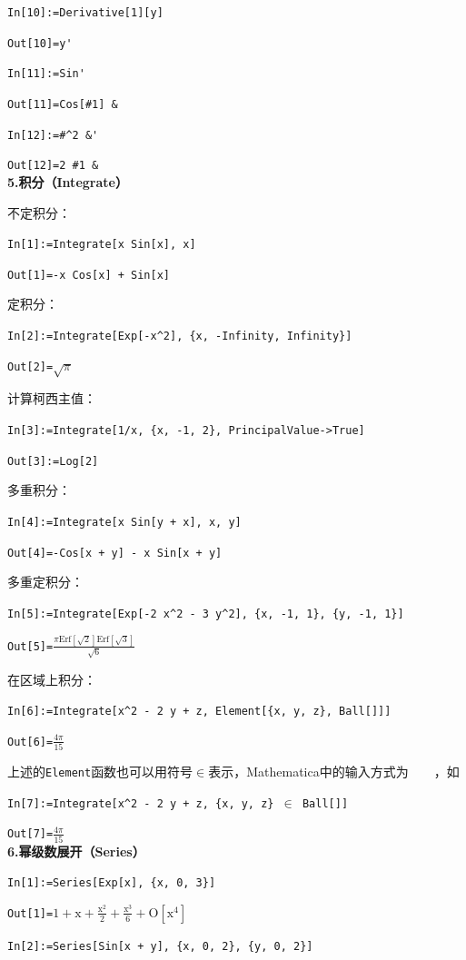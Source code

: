 \documentclass[UTF8,a4paper,10pt]{ctexart}
\newcommand{\mma}{Mathematica}
\begin{document}
\verb|In[10]:=Derivative[1][y]|   

\verb|Out[10]=y'|

\verb|In[11]:=Sin'|   

\verb|Out[11]=Cos[#1] &|

\verb|In[12]:=#^2 &'|   

\verb|Out[12]=2 #1 &|
\\

\textbf{5.积分（Integrate）}

不定积分：

\verb|In[1]:=Integrate[x Sin[x], x]|

\verb|Out[1]=-x Cos[x] + Sin[x]|

定积分：

\verb|In[2]:=Integrate[Exp[-x^2], {x, -Infinity, Infinity}]|

\verb|Out[2]=|$\sqrt{\pi }$

计算柯西主值：

\verb|In[3]:=Integrate[1/x, {x, -1, 2}, PrincipalValue->True]|

\verb|Out[3]:=Log[2]|

多重积分：

\verb|In[4]:=Integrate[x Sin[y + x], x, y]|

\verb|Out[4]=-Cos[x + y] - x Sin[x + y]|

多重定积分：

\verb|In[5]:=Integrate[Exp[-2 x^2 - 3 y^2], {x, -1, 1}, {y, -1, 1}]|

\verb|Out[5]=|$\frac{\pi  \text{Erf}[\sqrt{2}] \text{Erf}[\sqrt{3}]}{\sqrt{6}}$

在区域上积分：

\verb|In[6]:=Integrate[x^2 - 2 y + z, Element[{x, y, z}, Ball[]]]|

\verb|Out[6]=|$\frac{4 \pi }{15}$

上述的\verb|Element|函数也可以用符号$\in$表示，\mma 中的输入方式为~~~~，如

\verb|In[7]:=Integrate[x^2 - 2 y + z, {x, y, z} |$\in$\verb| Ball[]]|

\verb|Out[7]=|$\frac{4 \pi }{15}$
\\

\textbf{6.幂级数展开（Series）}

\verb|In[1]:=Series[Exp[x], {x, 0, 3}]|

\verb|Out[1]=|$1+\text{x}+\frac{\text{x}^2}{2}+\frac{\text{x}^3}{6}+\text{O}[\text{x}^4]$

\verb|In[2]:=Series[Sin[x + y], {x, 0, 2}, {y, 0, 2}]|
\end{document}
